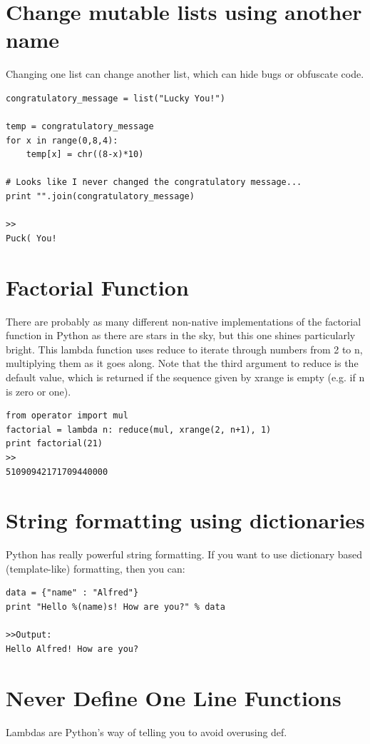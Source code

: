 \documentclass[12pt,a4paper,final,twoside,onecolumn,titlepage]{book}
\begin{document}
\section{Change mutable lists using another name}
Changing one list can change another list, which can hide bugs or obfuscate code.
\begin{lstlisting}
congratulatory_message = list("Lucky You!")

temp = congratulatory_message
for x in range(0,8,4):
    temp[x] = chr((8-x)*10)

# Looks like I never changed the congratulatory message...
print "".join(congratulatory_message)

>>
Puck( You!
\end{lstlisting}

\section{Factorial Function}
There are probably as many different non-native implementations of the factorial function in Python as there are stars in the sky, but this one shines particularly bright. This lambda function uses reduce to iterate through numbers from 2 to n, multiplying them as it goes along. Note that the third argument to reduce is the default value, which is returned if the sequence given by xrange is empty (e.g. if n is zero or one).
\begin{lstlisting}
from operator import mul
factorial = lambda n: reduce(mul, xrange(2, n+1), 1)
print factorial(21)
>>
51090942171709440000
\end{lstlisting}

\section{String formatting using dictionaries}
Python has really powerful string formatting. If you want to use dictionary based (template-like) formatting, then you can:
\begin{lstlisting}
data = {"name" : "Alfred"}
print "Hello %(name)s! How are you?" % data

>>Output:
Hello Alfred! How are you?
\end{lstlisting}

\section{Never Define One Line Functions}
Lambdas are Python's way of telling you to avoid overusing def. 
\end{document}
